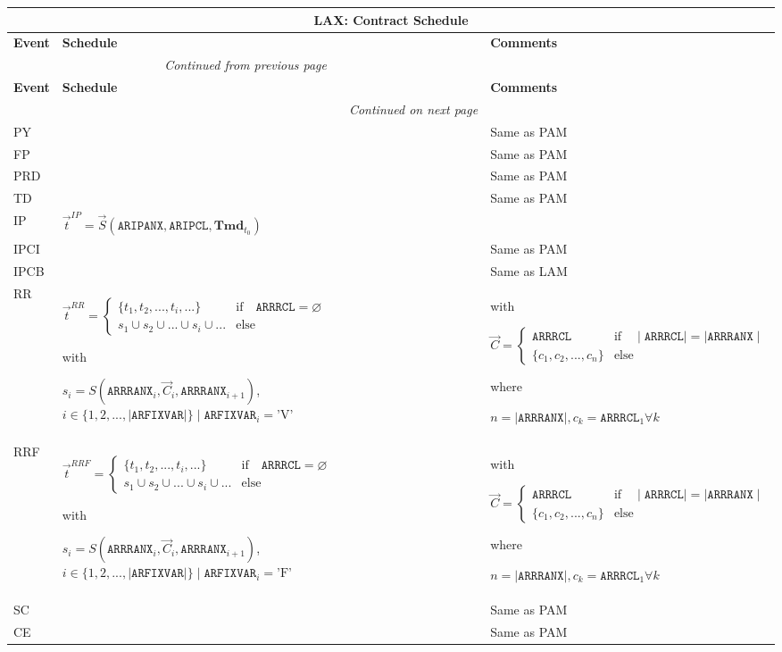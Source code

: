 \documentclass[9pt,oneside]{amsart}
\newenvironment{schedule}[1]{
	\hfill %
	\begin{longtable}{| p{0.05\textwidth} | p{0.5\textwidth} |  p{0.4\textwidth} |}
	\multicolumn{3}{c}{\textbf{#1: Contract Schedule}}\\
	\hline
	\textbf{Event} & \textbf{Schedule} & \textbf{Comments} \\
	\hline
	\endfirsthead
	\multicolumn{2}{c}{\textit{Continued from previous page}} \\
	\hline
	\textbf{Event} & \textbf{Schedule} & \textbf{Comments} \\
	\hline
	\endhead
	\hline \multicolumn{2}{r}{\textit{Continued on next page}} \\
	\endfoot
	\endlastfoot
}{%
	\hline
	\end{longtable}
}
\newcommand{\svar}[2]{\textbf{#1}_{#2}}
\newcommand{\attr}[1]{\texttt{#1}}
\newcommand{\sdl}[3]{S(#1,#2,#3)}
\newcommand{\vsdl}[3]{\vec{S}(#1,#2,#3)}
\newcommand{\undef}{\varnothing}
\begin{document}
\begin{schedule}{LAX}
	\hline
	PY & & Same as PAM \\
	\hline
	FP & & Same as PAM \\
	\hline
	PRD & & Same as PAM \\
	\hline
	TD & & Same as PAM \\
	\hline
	IP & $\vec{t}^{IP} = \vsdl{\attr{ARIPANX}}{\attr{ARIPCL}}{\svar{Tmd}{t_0}}$ & \\
	\hline
	IPCI & & Same as PAM \\
  	\hline
	IPCB & & Same as LAM \\
	\hline
	RR & $\vec{t}^{RR} = \begin{cases} \{ t_1, t_2, ..., t_i, ... \} & \text{if}\quad \attr{ARRRCL}=\undef \\
					s_1 \cup s_2 \cup ... \cup s_i \cup ... & \text{else} \end{cases}$ \par
		with\par
		$s_i=\sdl{\attr{ARRRANX}_i}{\vec{C}_i}{\attr{ARRRANX}_{i+1}}$, $i\in\{1,2,...,\mid\attr{ARFIXVAR}\mid\} \mid \attr{ARFIXVAR}_i = \text{'V'}$
		& with\par $\vec{C} = \begin{cases} \attr{ARRRCL} & \text{if} \quad \mid\attr{ARRRCL}\mid = \mid \attr{ARRRANX}\mid \\
				   \{ c_1, c_2, ..., c_n \}  & \text{else} \end{cases}$ \par
			where\par
			$n=\mid\attr{ARRRANX}\mid, c_k=\attr{ARRRCL}_1\forall k$ \\
	\hline
	RRF & $\vec{t}^{RRF} = \begin{cases} \{ t_1, t_2, ..., t_i, ... \} & \text{if}\quad \attr{ARRRCL}=\undef \\
					s_1 \cup s_2 \cup ... \cup s_i \cup ... & \text{else} \end{cases}$ \par
		with\par
		$s_i=\sdl{\attr{ARRRANX}_i}{\vec{C}_i}{\attr{ARRRANX}_{i+1}}$, $i\in\{1,2,...,\mid\attr{ARFIXVAR}\mid\} \mid \attr{ARFIXVAR}_i = \text{'F'}$
		& with\par $\vec{C} = \begin{cases} \attr{ARRRCL} & \text{if} \quad \mid\attr{ARRRCL}\mid = \mid \attr{ARRRANX}\mid \\
				   \{ c_1, c_2, ..., c_n \}  & \text{else} \end{cases}$ \par
			where\par
			$n=\mid\attr{ARRRANX}\mid, c_k=\attr{ARRRCL}_1\forall k$ \\
	\hline
	SC & & Same as PAM \\
	\hline
	CE & & Same as PAM \\
\end{schedule}
\end{document}

